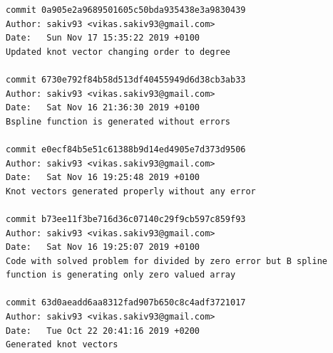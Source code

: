 \documentclass[11pt]{article}
\begin{document}
\begin{Verbatim}[breaklines=true]
commit 0a905e2a9689501605c50bda935438e3a9830439
Author: sakiv93 <vikas.sakiv93@gmail.com>
Date:   Sun Nov 17 15:35:22 2019 +0100
Updated knot vector changing order to degree

commit 6730e792f84b58d513df40455949d6d38cb3ab33
Author: sakiv93 <vikas.sakiv93@gmail.com>
Date:   Sat Nov 16 21:36:30 2019 +0100
Bspline function is generated without errors

commit e0ecf84b5e51c61388b9d14ed4905e7d373d9506
Author: sakiv93 <vikas.sakiv93@gmail.com>
Date:   Sat Nov 16 19:25:48 2019 +0100
Knot vectors generated properly without any error

commit b73ee11f3be716d36c07140c29f9cb597c859f93
Author: sakiv93 <vikas.sakiv93@gmail.com>
Date:   Sat Nov 16 19:25:07 2019 +0100
Code with solved problem for divided by zero error but B spline function is generating only zero valued array

commit 63d0aeadd6aa8312fad907b650c8c4adf3721017
Author: sakiv93 <vikas.sakiv93@gmail.com>
Date:   Tue Oct 22 20:41:16 2019 +0200
Generated knot vectors
\end{Verbatim}

\newpage


\noindent

 
\end{document}
